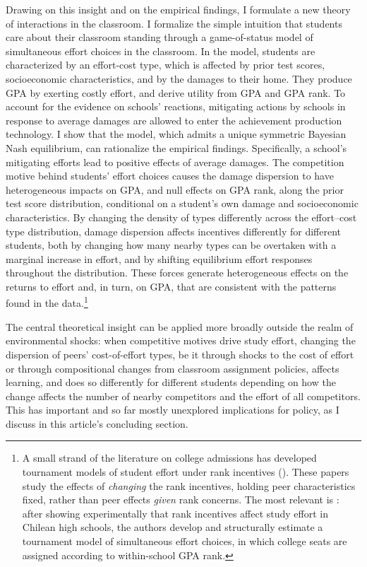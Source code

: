  
 

Drawing on this insight and on the empirical findings, I formulate a new theory of interactions in the classroom. I formalize the simple intuition that students care about their classroom standing through a game-of-status model of simultaneous effort choices in the classroom. In the model, students are characterized by an effort-cost type, which is affected by prior test scores, socioeconomic characteristics, and by the damages to their home. They produce GPA by exerting costly effort, and derive utility from GPA and GPA rank. To account for the evidence on schools' reactions, mitigating actions by schools in response to average damages are allowed to enter the achievement production technology. I show that the model, which admits a unique symmetric Bayesian Nash equilibrium, can rationalize the empirical findings. Specifically, a school's mitigating efforts lead to positive effects of average damages. The competition motive behind students' effort choices causes the damage dispersion to have heterogeneous impacts on GPA, and null effects on GPA rank, along the prior test score distribution, conditional on a student's own damage and socioeconomic characteristics. By changing the density of types differently across the effort–cost type distribution, damage dispersion affects incentives differently for different students, both by changing how many nearby types can be overtaken with a marginal increase in effort, and by shifting equilibrium effort responses throughout the distribution. These forces generate heterogeneous effects on the returns to effort and, in turn, on GPA, that are consistent with the patterns found in the data.\footnote{A small strand of the literature on college admissions has developed tournament models of student effort under rank incentives (\cite{bodoh2017pre,grau2018impact,tincani2025college}). These papers study the effects of {\itshape changing} the rank incentives, holding peer characteristics fixed, rather than peer effects {\itshape given} rank concerns. The most relevant is \cite{tincani2025college}: after showing experimentally that rank incentives affect study effort in Chilean high schools, the authors develop and structurally estimate a tournament model of simultaneous effort choices, in which college seats are assigned according to within-school GPA rank.\label{fn:tournaments} }  \par 

The central theoretical insight can be applied more broadly outside the realm of environmental shocks: when competitive motives drive study effort, changing the dispersion of peers' cost-of-effort types, be it through shocks to the cost of effort or through compositional changes from classroom assignment policies, affects learning, and does so differently for different students depending on how the change affects the number of nearby competitors and the effort of all competitors. This has important and so far mostly unexplored implications for policy, as I discuss in this article's concluding section.\par 


